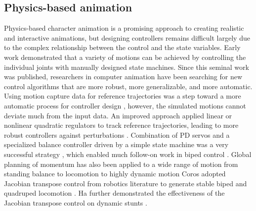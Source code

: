 \subsection{Physics-based animation}
Physics-based character animation is a promising approach to creating
realistic and interactive animations, but designing controllers
remains difficult largely due to the complex relationship between the
control and the state variables. 
Early work \cite{Hodgins:1995:AHA,Wooten:1998:Phd} demonstrated that 
a variety of motions can be achieved by controlling the individual joints with
manually designed state machines. Since this seminal work was
published, researchers in computer animation have been searching for
new control algorithms that are more robust, more generalizable, and
more automatic. 
Using motion capture data for reference
trajectories was a step toward a more automatic process for controller
design 
\cite{Zordan:2005:DRM,Sok:2007:SBB}, 
however, the simulated motions
cannot deviate much from the input data. An improved approach applied
linear or nonlinear quadratic regulators to track reference
trajectories, leading to more robust controllers against perturbations
\cite{daSilva:2008:ISS,Muico:2009:CNC}. Combination of PD servos and a
specialized balance controller driven by a simple state machine was a
very successful strategy \cite{Yin:2007:SIM}, which enabled much
follow-on work in biped control 
\cite{Wang:2009:OWC,Coros:2010:GBW,Lee:2010:DDB,Jain:2011:CPC}. 
Global planning of momentum
has also been applied to a wide range of motion from standing balance
\cite{Macchietto:2009:MCB} to locomotion 
\cite{Mordatch:2010:RPL,Ye:2010:OFC}
to highly dynamic motion 
\cite{Ha:2012:FAL,Liu:2012:TRC,AlBorno:2013:TOF,Zordan:2014:CRD}
Coros \etal adopted Jacobian transpose control from robotics literature
\cite{Sunada:1994:ACJ} to generate stable biped and quadruped
locomotion \cite{Coros:2010:GBW,Coros:2011:LSS}. Ha \etal further
demonstrated the effectiveness of the Jacobian transpose control on
dynamic stunts 
\cite{Liu:2010:SCM,Ha:2012:FAL,Ha:2014:ITD}.

